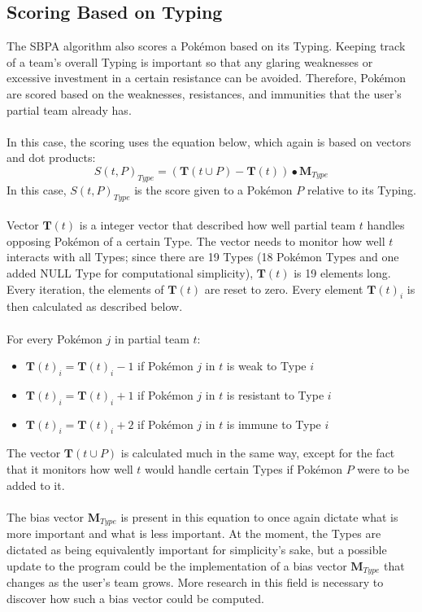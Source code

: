 \documentclass{article}
\begin{document}
\subsection{Scoring Based on Typing}
The SBPA algorithm also scores a Pok\'emon based on its Typing. Keeping track of a team's overall Typing is important so that any glaring weaknesses or excessive investment in a certain resistance can be avoided. Therefore, Pok\'emon are scored based on the weaknesses, resistances, and immunities that the user's partial team already has.\\\\
In this case, the scoring uses the equation below, which again is based on vectors and dot products:
\begin{equation}\label{TypeScoreEqn}
	S(t,P)_{Type}=(\textbf{T}(t\cup P)-\textbf{T}(t))\bullet\textbf{M}_{Type}
\end{equation}
In this case, $S(t,P)_{Type}$ is the score given to a Pok\'emon $P$ relative to its Typing.\\\\
Vector $\textbf{T}(t)$ is a integer vector that described how well partial team $t$ handles opposing Pok\'emon of a certain Type. The vector needs to monitor how well $t$ interacts with all Types; since there are 19 Types (18 Pok\'emon Types and one added NULL Type for computational simplicity), $\textbf{T}(t)$ is 19 elements long. Every iteration, the elements of $\textbf{T}(t)$ are reset to zero. Every element $\textbf{T}(t)_i$ is then calculated as described below.\\\\
For every Pok\'emon $j$ in partial team $t$:
\begin{itemize}
	\item $\textbf{T}(t)_i=\textbf{T}(t)_i-1$ if Pok\'emon $j$ in $t$ is weak to Type $i$
	\item $\textbf{T}(t)_i=\textbf{T}(t)_i+1$ if Pok\'emon $j$ in $t$ is resistant to Type $i$
	\item $\textbf{T}(t)_i=\textbf{T}(t)_i+2$ if Pok\'emon $j$ in $t$ is immune to Type $i$
\end{itemize}
The vector $\textbf{T}(t\cup P)$ is calculated much in the same way, except for the fact that it monitors how well $t$ would handle certain Types if Pok\'emon $P$ were to be added to it.\\\\
The bias vector $\textbf{M}_{Type}$ is present in this equation to once again dictate what is more important and what is less important. At the moment, the Types are dictated as being equivalently important for simplicity's sake, but a possible update to the program could be the implementation of a bias vector $\textbf{M}_{Type}$ that changes as the user's team grows. More research in this field is necessary to discover how such a bias vector could be computed.\\\\
\end{document}
